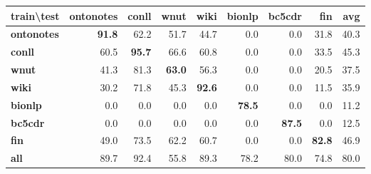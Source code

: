 \documentclass[11pt,a4paper]{article}
\begin{document}
\begin{table*}[ht]
\centering
\begin{tabular}{l|rrrrrrr|r}
\hline
\textbf{train\textbackslash{}test} & \textbf{ontonotes} & \textbf{conll} & \textbf{wnut} & \textbf{wiki} & \textbf{bionlp} & \textbf{bc5cdr} & \textbf{fin}  & \textbf{avg} \\ \hline
\textbf{ontonotes}                & \textbf{91.8}       & 62.2               & 51.7              & 44.7                      & 0.0                 & 0.0             & 31.8          & 40.3         \\ \hline
\textbf{conll}                 & 60.5                & \textbf{95.7}      & 66.6              & 60.8                      & 0.0                 & 0.0             & 33.5          & 45.3         \\ \hline
\textbf{wnut}                  & 41.3                & 81.3               & \textbf{63.0}     & 56.3                      & 0.0                 & 0.0             & 20.5          & 37.5         \\ \hline
\textbf{wiki}          & 30.2                & 71.8               & 45.3              & \textbf{92.6}             & 0.0                 & 0.0             & 11.5          & 35.9         \\ \hline
\textbf{bionlp}                & 0.0                 & 0.0                & 0.0               & 0.0                       & \textbf{78.5}       & 0.0             & 0.0           & 11.2         \\ \hline
\textbf{bc5cdr}                    & 0.0                 & 0.0                & 0.0               & 0.0                       & 0.0                 & \textbf{87.5}   & 0.0           & 12.5         \\ \hline
\textbf{fin}                       & 49.0                & 73.5               & 62.2              & 60.7                      & 0.0                 & 0.0             & \textbf{82.8} & 46.9         \\ \hline \hline
\textbf{all}              & 89.7                & 92.4               & 55.8              & 89.3                      & 78.2                & 80.0            & 74.8          & 80.0        \\ \hline
\end{tabular}
\caption{\label{app:cross-domain-base}
{\it Type-ignored} F1 score in cross-domain setting over non-lower-cased English datasets with {\it XLM-R\textsubscript{BASE}}.
We compute average of accuracy in each test set, named as {\bf avg}. The model trained on all datasets listed here, is shown as {\bf all}.
}
\end{table*}
\end{document}
